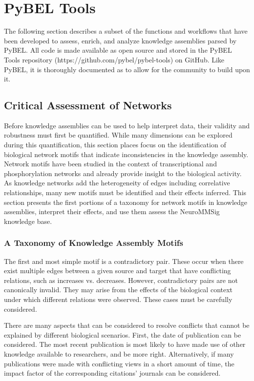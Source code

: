 \chapter{PyBEL Tools}
\label{ch:pybel_tools}

The following section describes a subset of the functions and workflows that have been developed to assess, enrich, and analyze knowledge assemblies parsed by PyBEL. All code is made available as open source and stored in the PyBEL Tools repository (https://github.com/pybel/pybel-tools) on GitHub. Like PyBEL, it is thoroughly documented as to allow for the community to build upon it.

\section{Critical Assessment of Networks}
Before knowledge assemblies can be used to help interpret data, their validity and robustness must first be quantified. While many dimensions can be explored during this quantification, this section places focus on the identification of biological network motifs that indicate inconsistencies in the knowledge assembly. Network motifs have been studied in the context of transcriptional and phosphorylation networks \cite{Alon2007} and already provide insight to the biological activity. As knowledge networks add the heterogeneity of edges including correlative relationships, many new motifs must be identified and their effects inferred. This section presents the first portions of a taxonomy for network motifs in knowledge assemblies, interpret their effects, and use them assess the \ac{NeuroMMSig} knowledge base.

\subsection{A Taxonomy of Knowledge Assembly Motifs}

The first and most simple motif is a contradictory pair. These occur when there exist multiple edges between a given source and target that have conflicting relations, such as increases vs. decreases. However, contradictory pairs are not canonically invalid. They may arise from the effects of the biological context under which different relations were observed. These cases must be carefully considered.

There are many aspects that can be considered to resolve conflicts that cannot be explained by different biological scenarios. First, the date of publication can be considered. The most recent publication is most likely to have made use of other knowledge available to researchers, and be more right. Alternatively, if many publications were made with conflicting views in a short amount of time, the impact factor of the corresponding citations' journals can be considered.  

